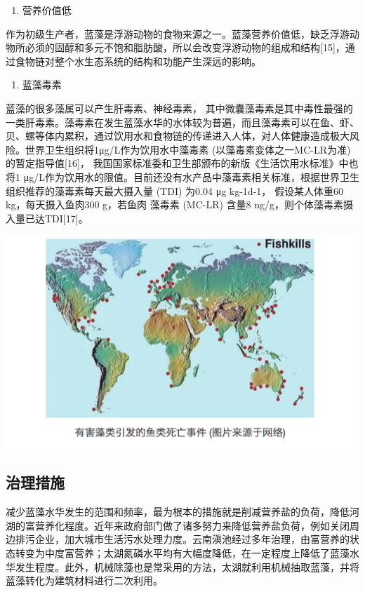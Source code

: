 \documentclass[]{book}
\providecommand{\tightlist}{%
  \setlength{\itemsep}{0pt}\setlength{\parskip}{0pt}}
\begin{document}
\begin{enumerate}
\def\labelenumi{\arabic{enumi}.}
\setcounter{enumi}{1}
\tightlist
\item
  营养价值低
\end{enumerate}

作为初级生产者，蓝藻是浮游动物的食物来源之一。蓝藻营养价值低，缺乏浮游动物所必须的固醇和多元不饱和脂肪酸，所以会改变浮游动物的组成和结构{[}15{]}，通过食物链对整个水生态系统的结构和功能产生深远的影响。

\begin{enumerate}
\def\labelenumi{\arabic{enumi}.}
\setcounter{enumi}{2}
\tightlist
\item
  蓝藻毒素
\end{enumerate}

蓝藻的很多藻属可以产生肝毒素、神经毒素，
其中微囊藻毒素是其中毒性最强的一类肝毒素。藻毒素在发生蓝藻水华的水体较为普遍，而且藻毒素可以在鱼、虾、贝、螺等体内累积，通过饮用水和食物链的传递进入人体，对人体健康造成极大风险。世界卫生组织将1μg/L作为饮用水中藻毒素
(以藻毒素变体之一MC-LR为准) 的暂定指导值{[}16{]}，
我国国家标准委和卫生部颁布的新版《生活饮用水标准》中也将1
μg/L作为饮用水的限值。目前还没有水产品中藻毒素相关标准，根据世界卫生组织推荐的藻毒素每天最大摄入量
(TDI) 为0.04 μg kg-1d-1， 假设某人体重60 kg，每天摄入鱼肉300 g，若鱼肉
藻毒素 (MC-LR) 含量8 ng/g，则个体藻毒素摄入量已达TDI{[}17{]}。

\includegraphics[width=8.33in]{images/lanzao3}

\subsection{治理措施}

减少蓝藻水华发生的范围和频率，最为根本的措施就是削减营养盐的负荷，降低河湖的富营养化程度。近年来政府部门做了诸多努力来降低营养盐负荷，例如关闭周边排污企业，加大城市生活污水处理力度。云南滇池经过多年治理，由富营养的状态转变为中度富营养；太湖氮磷水平均有大幅度降低，在一定程度上降低了蓝藻水华发生程度。此外，机械除藻也是常采用的方法，太湖就利用机械抽取蓝藻，并将蓝藻转化为建筑材料进行二次利用。
\end{document}
